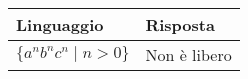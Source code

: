 \documentclass{standalone}
\begin{document}
\begin{tabularx}{\textwidth}{XX}
		Linguaggio & Risposta \\
    \midrule
        $\{ a^n b^n c^n \mid n > 0 \}$
        &
				Non è libero
\end{tabularx}
\end{document}
